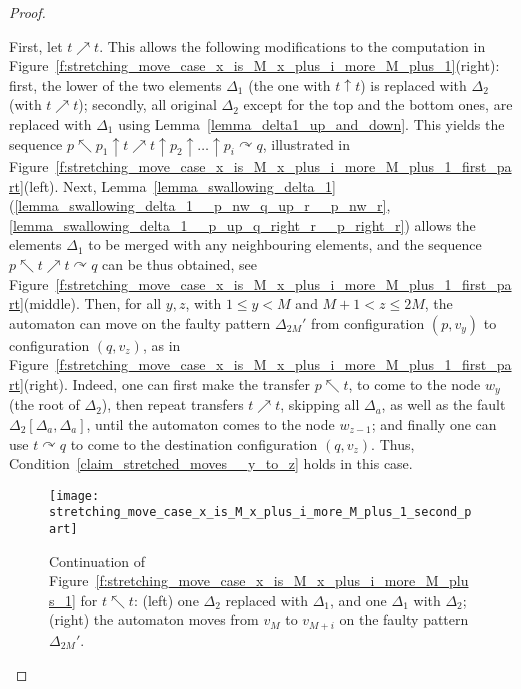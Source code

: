 \documentclass[12pt,a4paper]{article}
\theoremstyle{definition}
\begin{document}
\begin{proof}
\begin{itemize}
	First, let $t \nearrow t$.
	This allows the following modifications to the computation
	in Figure~\ref{f:stretching_move_case_x_is_M_x_plus_i_more_M_plus_1}(right):
	first, the lower of the two elements $\Delta_1$
	(the one with $t \uparrow t$) is replaced with $\Delta_2$ (with $t \nearrow t$);
	secondly, all original $\Delta_2$ except for the top and the bottom ones,
	are replaced with $\Delta_1$ using Lemma~\ref{lemma_delta1_up_and_down}.
	This yields the sequence
	$p \nwarrow p_1 \uparrow t \nearrow t \uparrow p_2 \uparrow \ldots \uparrow p_i \curvearrowright q$,
	illustrated in Figure~\ref{f:stretching_move_case_x_is_M_x_plus_i_more_M_plus_1_first_part}(left).
	Next, Lemma~\ref{lemma_swallowing_delta_1}(\ref{lemma_swallowing_delta_1__p_nw_q_up_r__p_nw_r},\ref{lemma_swallowing_delta_1__p_up_q_right_r__p_right_r})
	allows the elements $\Delta_1$ to be merged with any neighbouring elements,
	and the sequence $p \nwarrow t \nearrow t \curvearrowright q$ can be thus obtained,
	see Figure~\ref{f:stretching_move_case_x_is_M_x_plus_i_more_M_plus_1_first_part}(middle).
	Then, for all $y,z$, with $1\leqslant y < M$ and $M+1 < z \leqslant 2M$,
	the automaton can move on the faulty pattern $\Delta_{2M}'$ 
	from configuration $(p, v_y)$ to configuration $(q,v_z)$,
	as in Figure~\ref{f:stretching_move_case_x_is_M_x_plus_i_more_M_plus_1_first_part}(right).
	Indeed, one can first make the transfer $p \nwarrow t$,
	to come to the node $w_y$ (the root of $\Delta_2$),
	then repeat transfers $t \nearrow t$, 
	skipping all $\Delta_a$, as well as the fault $\Delta_2[\Delta_a,\Delta_a]$,
	until the automaton comes to the node $w_{z-1}$;
	and finally one can use $t \curvearrowright q$
	to come to the destination configuration $(q,v_z)$.
	Thus, Condition~\ref{claim_stretched_moves__y_to_z} holds in this case.

\begin{figure}[t]
	\centerline{\texttt{[image: stretching\_move\_case\_x\_is\_M\_x\_plus\_i\_more\_M\_plus\_1\_second\_part]}}
	\caption{Continuation of Figure~\ref{f:stretching_move_case_x_is_M_x_plus_i_more_M_plus_1}
	for $t \nwarrow t$:
	(left) one $\Delta_2$ replaced with $\Delta_1$, and one $\Delta_1$ with $\Delta_2$;
	(right) the automaton moves from $v_M$ to $v_{M+i}$ on the faulty pattern $\Delta_{2M}'$.}
	\label{f:stretching_move_case_x_is_M_x_plus_i_more_M_plus_1_second_part}
\end{figure}


\end{itemize}
\end{proof}
\end{document}

